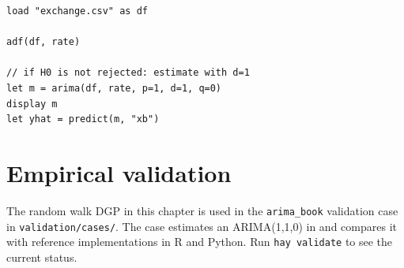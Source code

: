 \begin{lstlisting}[caption={Typical workflow with real data}]
load "exchange.csv" as df

adf(df, rate)

// if H0 is not rejected: estimate with d=1
let m = arima(df, rate, p=1, d=1, q=0)
display m
let yhat = predict(m, "xb")
\end{lstlisting}

\section{Empirical validation}

The random walk DGP in this chapter is used in the \texttt{arima_book}
validation case in \texttt{validation/cases/}. The case estimates an
ARIMA(1,1,0) in \hayashi{} and compares it with reference implementations in
R and Python. Run \lstinline{hay validate} to see the current status.
